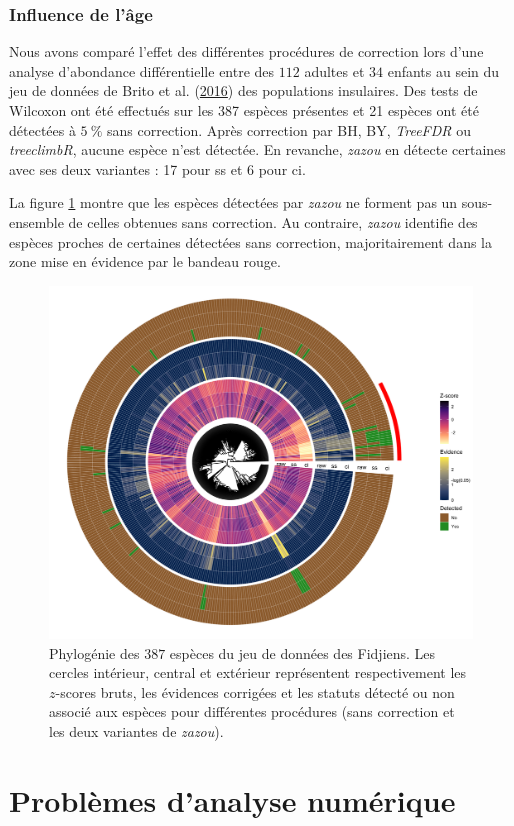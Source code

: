 \documentclass[12pt,a4paper]{reedthesis}
\theoremstyle{definition}
\theoremstyle{definition}
\theoremstyle{definition}
\theoremstyle{remark}
\begin{document}
\hypertarget{influence-de-luxe2ge}{%
\subsection{Influence de l'âge}\label{influence-de-luxe2ge}}

Nous avons comparé l'effet des différentes procédures de correction lors d'une analyse d'abondance différentielle entre des \(112\) adultes et \(34\) enfants au sein du jeu de données de Brito et al. (\protect\hyperlink{ref-brito2016mobile}{2016}) des populations insulaires. Des tests de Wilcoxon ont été effectués sur les 387 espèces présentes et 21 espèces ont été détectées à \(5~\%\) sans correction. Après correction par BH, BY, \emph{TreeFDR} ou \emph{treeclimbR}, aucune espèce n'est détectée. En revanche, \emph{zazou} en détecte certaines avec ses deux variantes : 17 pour ss et 6 pour ci.

La figure \ref{fig:heattree} montre que les espèces détectées par \emph{zazou} ne forment pas un sous-ensemble de celles obtenues sans correction. Au contraire, \emph{zazou} identifie des espèces proches de certaines détectées sans correction, majoritairement dans la zone mise en évidence par le bandeau rouge.


\begin{figure}[!t]

{\centering \includegraphics[width=0.9\linewidth]{img/heattree} 

}

\caption{Phylogénie des \(387\) espèces du jeu de données des Fidjiens. Les cercles intérieur, central et extérieur représentent respectivement les \(z\)-scores bruts, les évidences corrigées et les statuts détecté ou non associé aux espèces pour différentes procédures (sans correction et les deux variantes de \emph{zazou}).}\label{fig:heattree}
\end{figure}
\hypertarget{ananum}{%
\chapter{Problèmes d'analyse numérique}\label{ananum}}
\end{document}
